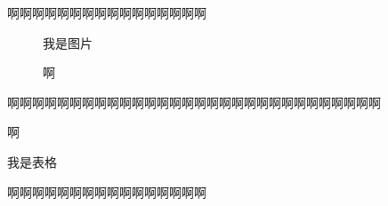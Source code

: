 \documentclass{ctexart}
\begin{document}
啊啊啊啊啊啊啊啊啊啊啊啊啊啊啊啊

\begin{figure}[htbp]
\centering
我是图片
\caption{啊}
\end{figure}

啊啊啊啊啊啊啊啊啊啊啊啊啊啊啊啊啊啊啊啊啊啊啊啊啊啊啊啊啊啊

\begin{table}[htbp]
\centering
\caption{啊}
我是表格
\end{table}

啊啊啊啊啊啊啊啊啊啊啊啊啊啊啊啊

\the\intextsep

\the\textfloatsep

\the\abovecaptionskip

\the\belowcaptionskip
\end{document}
